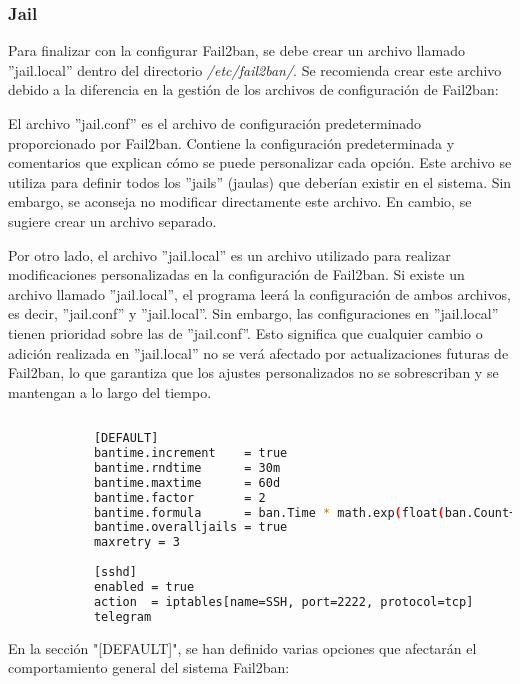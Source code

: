 			\subsubsection{Jail}
			
			
			Para finalizar con la configurar Fail2ban, se debe crear un archivo llamado ''jail.local'' dentro del directorio \textit{/etc/fail2ban/}. Se recomienda crear este archivo debido a la diferencia en la gestión de los archivos de configuración de Fail2ban:\par
			
			El archivo ''jail.conf'' es el archivo de configuración predeterminado proporcionado por Fail2ban. Contiene la configuración predeterminada y comentarios que explican cómo se puede personalizar cada opción. Este archivo se utiliza para definir todos los ''jails'' (jaulas) que deberían existir en el sistema. Sin embargo, se aconseja no modificar directamente este archivo. En cambio, se sugiere crear un archivo separado.\par
			
			Por otro lado, el archivo ''jail.local'' es un archivo utilizado para realizar modificaciones personalizadas en la configuración de Fail2ban. Si existe un archivo llamado ''jail.local'', el programa leerá la configuración de ambos archivos, es decir, ''jail.conf'' y ''jail.local''. Sin embargo, las configuraciones en ''jail.local'' tienen prioridad sobre las de ''jail.conf''. Esto significa que cualquier cambio o adición realizada en ''jail.local'' no se verá afectado por actualizaciones futuras de Fail2ban, lo que garantiza que los ajustes personalizados no se sobrescriban y se mantengan a lo largo del tiempo.\par
		
			\begin{lstlisting}[language=Bash, caption=Jaula ssh]
		
			[DEFAULT]
			bantime.increment    = true
			bantime.rndtime      = 30m
			bantime.maxtime      = 60d
			bantime.factor       = 2
			bantime.formula      = ban.Time * math.exp(float(ban.Count+1)*banFactor)/math.exp(1*banFactor)
			bantime.overalljails = true
			maxretry = 3
			
			[sshd]
			enabled = true
			action  = iptables[name=SSH, port=2222, protocol=tcp]
			telegram
			\end{lstlisting}
		
		
				En la sección "[DEFAULT]", se han definido varias opciones que afectarán el comportamiento general del sistema Fail2ban:\par
			
